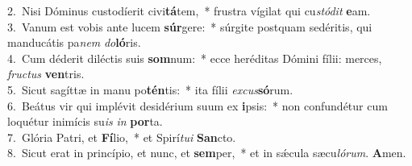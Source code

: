{2.~}Nisi Dóminus custodíerit civi\textbf{tá}tem,~* frustra vígilat qui cu\textit{stó}\textit{dit} \textbf{e}am.\\
{3.~}Vanum est vobis ante lucem \textbf{súr}gere:~* súrgite postquam sedéritis, qui manducátis pa\textit{nem} \textit{do}\textbf{ló}ris.\\
{4.~}Cum déderit diléctis suis \textbf{som}num:~* ecce heréditas Dómini fílii: merces, \textit{fru}\textit{ctus} \textbf{ven}tris.\\
{5.~}Sicut sagíttæ in manu po\textbf{tén}tis:~* ita fílii \textit{ex}\textit{cus}\textbf{só}rum.\\
{6.~}Beátus vir qui implévit desidérium suum ex \textbf{i}psis:~* non confundétur cum loquétur inimícis su\textit{is} \textit{in} \textbf{por}ta.\\
{7.~}Glória Patri, et \textbf{Fí}lio,~* et Spirí\textit{tu}\textit{i} \textbf{San}cto.\\
{8.~}Sicut erat in princípio, et nunc, et \textbf{sem}per,~* et in sǽcula sæcu\textit{ló}\textit{rum}. \textbf{A}men.\\
